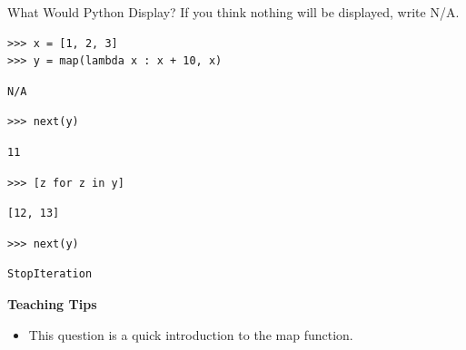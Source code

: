 \begin{blocksection}
\question What Would Python Display? If you think nothing will be displayed, write N/A.

\begin{lstlisting}
>>> x = [1, 2, 3]
>>> y = map(lambda x : x + 10, x)
\end{lstlisting}
\begin{solution}[0.2in]
\begin{lstlisting}
N/A
\end{lstlisting}
\end{solution}

\begin{lstlisting}
>>> next(y)
\end{lstlisting}
\begin{solution}[0.2in]
\begin{lstlisting}
11
\end{lstlisting}
\end{solution}

\begin{lstlisting}
>>> [z for z in y]
\end{lstlisting}
\begin{solution}[0.2in]
\begin{lstlisting}
[12, 13]
\end{lstlisting}
\end{solution}

\begin{lstlisting}
>>> next(y)
\end{lstlisting}
\begin{solution}[0.2in]
\begin{lstlisting}
StopIteration
\end{lstlisting}
\end{solution}
\end{blocksection}

\begin{guide}
\begin{blocksection}
    \textbf{Teaching Tips}
    \begin{itemize}
    \item This question is a quick introduction to the map function. 
    \end{itemize}
\end{blocksection}
\end{guide}